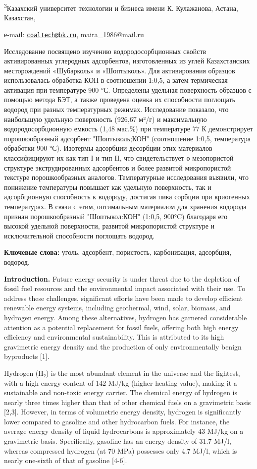 \textsuperscript{3}Казахский университет технологии и бизнеса имени К.
Кулажанова, Астана, Казахстан,

е-mail: \href{mailto:coaltech@bk.ru}{\nolinkurl{coaltech@bk.ru}},
maira\_1986@mail.ru

Исследование посвящено изучению водородосорбционных свойств
активированных углеродных адсорбентов, изготовленных из углей
Казахстанских месторождений «Шубарколь» и «Шоптыколь». Для активирования
образцов использовалась обработка КОН в соотношении 1:0,5, а затем
термическая активация при температуре 900 °С. Определены удельная
поверхность образцов с помощью метода БЭТ, а также проведена оценка их
способности поглощать водород при разных температурных режимах.
Исследование показало, что наибольшую удельную поверхность (926,67 м²/г)
и максимальную водородосорбционную емкость (1,48 мас.\%) при температуре
77 К демонстрирует порошкообразный адсорбент "Шоптыколь;КОН"
(соотношение 1:0,5, температура обработки 900 °С). Изотермы
адсорбции-десорбции этих материалов классифицируют их как тип I и тип
II, что свидетельствует о мезопористой структуре экструдированных
адсорбентов и более развитой микропористой текстуре порошкообразных
аналогов. Температурные исследования выявили, что понижение температуры
повышает как удельную поверхность, так и адсорбционную способность к
водороду, достигая пика сорбции при криогенных температурах. В связи с
этим, оптимальным материалом для хранения водорода признан
порошкообразный "Шоптыкол:КОН" (1:0,5, 900°C) благодаря его высокой
удельной поверхности, развитой микропористой структуре и исключительной
способности поглощать водород.

{\bfseries Ключевые слова:} уголь, адсорбент, пористость, карбонизация,
адсорбция, водород.

{\bfseries Introduction.} Future energy security is under threat due to the
depletion of fossil fuel resources and the environmental impact
associated with their use. To address these challenges, significant
efforts have been made to develop efficient renewable energy systems,
including geothermal, wind, solar, biomass, and hydrogen energy. Among
these alternatives, hydrogen has garnered considerable attention as a
potential replacement for fossil fuels, offering both high energy
efficiency and environmental sustainability. This is attributed to its
high gravimetric energy density and the production of only
environmentally benign byproducts {[}1{]}.

Hydrogen (H₂) is the most abundant element in the universe and the
lightest, with a high energy content of 142 MJ/kg (higher heating
value), making it a sustainable and non-toxic energy carrier. The
chemical energy of hydrogen is nearly three times higher than that of
other chemical fuels on a gravimetric basis {[}2,3{]}. However, in terms
of volumetric energy density, hydrogen is significantly lower compared
to gasoline and other hydrocarbon fuels. For instance, the average
energy density of liquid hydrocarbons is approximately 43 MJ/kg on a
gravimetric basis. Specifically, gasoline has an energy density of 31.7
MJ/l, whereas compressed hydrogen (at 70 MPa) possesses only 4.7 MJ/l,
which is nearly one-sixth of that of gasoline {[}4-6{]}.

